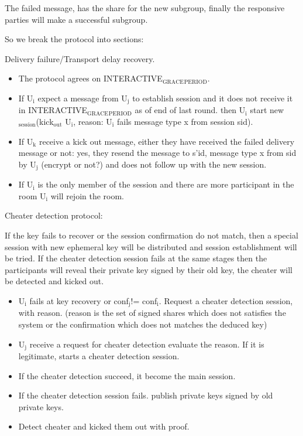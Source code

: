 \documentclass[11pt]{article}
\begin{document}
The failed message, has the share for the new subgroup, finally the responsive 
parties will make a successful subgroup.

So we break the protocol into sections:

Delivery failure/Transport delay recovery.

\begin{itemize}
\item The protocol agrees on INTERACTIVE$_{\text{GRACE}}$$_{\text{PERIOD}}$.
\item If U$_{\text{i}}$ expect a message from U$_{\text{j}}$ to establish session and it does not receive it in INTERACTIVE$_{\text{GRACE}}$$_{\text{PERIOD}}$ as of end of last round. then U$_{\text{i}}$ start new$_{\text{session}}$(kick$_{\text{out}}$ U$_{\text{i}}$, reason: U$_{\text{i}}$ fails message type x from session sid).
\item If U$_{\text{k}}$ receive a kick out message, either they have received the failed delivery message or not: yes, they resend the message to s'id, message type x from sid by U$_{\text{j}}$ (encrypt or not?) and does not follow up with the new
session.
\item If U$_{\text{i}}$ is the only member of the session and there are more participant in the room U$_{\text{i}}$ will rejoin the room.
\end{itemize}

Cheater detection protocol:

If the key fails to recover or the session confirmation do not match, then a special session with new ephemeral key will be distributed and session establishment will be tried. If the cheater detection session fails 
at the same stages then the participants will reveal their private key signed by their old key, the cheater will be detected and kicked out.

\begin{itemize}
\item U$_{\text{i}}$ fails at key recovery or conf$_{\text{j}}$!= conf$_{\text{i}}$. Request a cheater detection session, with reason. (reason is the set of signed shares which does not satisfies the system or the confirmation which does not matches the deduced key)
\item U$_{\text{j}}$ receive a request for cheater detection evaluate the reason. If it is legitimate, starts a cheater detection session.
\item If the cheater detection succeed, it become the main session.
\item If the cheater detection session fails. publish private keys signed by old private keys.
\item Detect cheater and kicked them out with proof.
\end{itemize}
\end{document}
